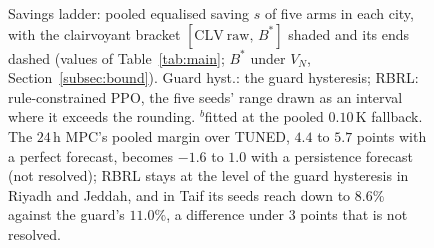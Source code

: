 \begin{figure}[t]
\caption{Savings ladder: pooled equalised saving $s$ of five arms in each city, with the clairvoyant bracket $[\mathrm{CLV\ raw},\,B^\ast]$ shaded and its ends dashed (values of Table~\ref{tab:main}; $B^\ast$ under $V_N$, Section~\ref{subsec:bound}). Guard hyst.: the guard hysteresis; RBRL: rule-constrained PPO, the five seeds' range drawn as an interval where it exceeds the rounding. $^{b}$fitted at the pooled $0.10\,$K fallback. The $24\,$h MPC's pooled margin over TUNED, $4.4$ to $5.7$ points with a perfect forecast, becomes $-1.6$ to $1.0$ with a persistence forecast (not resolved); RBRL stays at the level of the guard hysteresis in Riyadh and Jeddah, and in Taif its seeds reach down to $8.6\%$ against the guard's $11.0\%$, a difference under $3$ points that is not resolved.}
\label{fig:ladder}
\end{figure}
